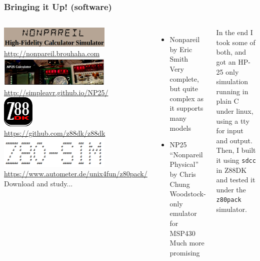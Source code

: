 \documentclass{beamer}
\newcommand{\tgreen}[1]{\textcolor{my-green}{#1}}
\newcommand{\tblue}[1]{\textcolor{my-blue}{#1}}
\newcommand{\tviolet}[1]{\textcolor{my-violet}{#1}}
\begin{document}
\begin{frame}[shrink=10]
  \frametitle{Bringing it Up!  (software)}
  \begin{columns}
    \scriptsize
    \includegraphics[width=0.7\textwidth]{figs/nonpareil.png} \\
    \url{http://nonpareil.brouhaha.com} \\
    \vskip 0.1in
    \includegraphics[width=0.7\textwidth]{figs/np25.png} \\
    \url{http://simpleavr.github.io/NP25/} \\
    \vskip 0.1in
    \includegraphics[width=0.2\textwidth]{figs/z88dk.png} \\
    \url{https://github.com/z88dk/z88dk}
    \vskip 0.1in
    \includegraphics[width=0.7\textwidth]{figs/z80-sim.png} \\
    \url{https://www.autometer.de/unix4fun/z80pack/}
    \tgreen{Download and study...}
      \begin{itemize}
      \scriptsize
      \item Nonpareil by Eric Smith \\
        Very complete, but quite complex as it supports
        many models
      \item NP25 ``Nonpareil Physical'' by Chris Chung \\
        Woodstock-only emulator for MSP430 \\
        Much more promising
      \end{itemize}
    \scriptsize

    \vskip 0.1in
    \tblue{In the end I took some of both, and got an HP-25 only
      simulation running in plain C under linux, using a tty
      for input and output.} \\

    \vskip 0.1in
    \tviolet{Then, I built it using {\tt sdcc} in Z88DK and tested
      it under the {\tt z80pack} simulator.}
  \end{columns}
\end{frame}
\end{document}
